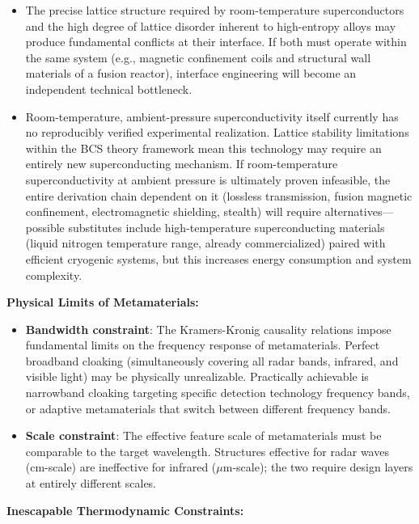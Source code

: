 \documentclass[aps,prd,twocolumn,superscriptaddress,nofootinbib]{revtex4-2}
\begin{document}
\begin{itemize}
  \item The precise lattice structure required by room-temperature superconductors and the high degree of lattice disorder inherent to high-entropy alloys may produce fundamental conflicts at their interface. If both must operate within the same system (e.g., magnetic confinement coils and structural wall materials of a fusion reactor), interface engineering will become an independent technical bottleneck.
  \item Room-temperature, ambient-pressure superconductivity itself currently has no reproducibly verified experimental realization. Lattice stability limitations within the BCS theory framework mean this technology may require an entirely new superconducting mechanism. If room-temperature superconductivity at ambient pressure is ultimately proven infeasible, the entire derivation chain dependent on it (lossless transmission, fusion magnetic confinement, electromagnetic shielding, stealth) will require alternatives---possible substitutes include high-temperature superconducting materials (liquid nitrogen temperature range, already commercialized) paired with efficient cryogenic systems, but this increases energy consumption and system complexity.
\end{itemize}

\textbf{Physical Limits of Metamaterials:}

\begin{itemize}
  \item \textbf{Bandwidth constraint}: The Kramers-Kronig causality relations impose fundamental limits on the frequency response of metamaterials. Perfect broadband cloaking (simultaneously covering all radar bands, infrared, and visible light) may be physically unrealizable. Practically achievable is narrowband cloaking targeting specific detection technology frequency bands, or adaptive metamaterials that switch between different frequency bands.
  \item \textbf{Scale constraint}: The effective feature scale of metamaterials must be comparable to the target wavelength. Structures effective for radar waves (cm-scale) are ineffective for infrared ($\mu$m-scale); the two require design layers at entirely different scales.
\end{itemize}

\textbf{Inescapable Thermodynamic Constraints:}
\end{document}
